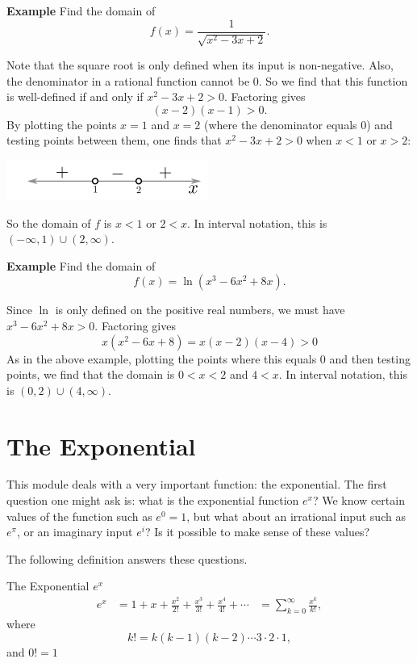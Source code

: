 \documentclass[twoside,openright,titlepage,a4paper]{book}
\begin{document}
\begin{sloppypar}
\textbf{Example} Find the domain of \[ f(x) = \frac{1}{\sqrt{x^2 -3x+2}}. \]
\begin{examplebox}
Note that the square root is only defined when its input is non-negative. Also, the denominator in a rational function cannot be 0. So we find that this function is well-defined if and only if ${x^2-3x+2>0}$. Factoring gives \[ (x-2)(x-1) > 0. \]
By plotting the points ${x=1}$ and ${x=2}$ (where the denominator equals 0) and testing points between them, one finds that ${x^2-3x+2>0}$ when ${x<1}$ or ${x>2}$:
\begin{center}
\includegraphics[scale=0.6]{PointChecking}
\end{center}
So the domain of $f$ is ${x<1}$ or ${2<x}$. In interval notation, this is ${\left(-\infty,1\right) \cup \left(2, \infty \right)}$.
\end{examplebox}
\bigbreak
\textbf{Example} Find the domain of \[ f(x) = \ln(x^3-6x^2+8x). \]
\begin{examplebox}
Since $\ln$ is only defined on the positive real numbers, we must have ${x^3-6x^2+8x>0}$. Factoring gives \[ x(x^2-6x+8) = x(x-2)(x-4)>0 \]
As in the above example, plotting the points where this equals 0 and then testing points, we find that the domain is ${0<x<2}$ and ${4<x}$. In interval notation, this is ${\left(0,2 \right) \cup \left(4,\infty\right)}$.
\end{examplebox}

\section{The Exponential} \label{ChFunctionsSecTheExponential}

This module deals with a very important function: the exponential. The first question one might ask is: what is the exponential function ${e^x}$? We know certain values of the function such as ${e^0=1}$, but what about an irrational input such as ${e^\pi}$, or an imaginary input ${e^i}$? Is it possible to make sense of these values?

The following definition answers these questions.
\begin{examplebox}
The Exponential $e^x$
\begin{align*} 
e^x &= 1+x+\frac{x^2}{2!} + \frac{x^3}{3!} + \frac{x^4}{4!} + \dotsb 
& = \sum_{k=0}^\infty \frac{x^k}{k!}, 
\end{align*}
where \[ k! = k(k-1)(k-2)\dotsb 3 \cdot 2 \cdot 1, \] and ${0! = 1}$
\end{examplebox}


\end{sloppypar}
\end{document}
